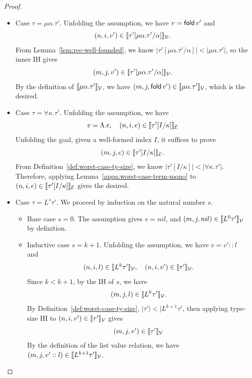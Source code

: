 \begin{proof}
\begin{itemize}
\begin{itemize}
\item {Subcase $m=0$.}
We get $(0,j,v) \in \vrel{\triangleright\tau'}$ directly by the definition.

\item {Subcase $m=k+1$.}
Since $m \leq n$, we have $p$ such that
$n = p+1$ and $k \leq p$. Unfolding $(p+1, i, v) \in \vrel{\triangleright \tau'}$ gives
\[v = \delay v',\quad \quad (p,i+1,v')\in\vrel{\tau'}.\]
Since $k \leq p$ and $j+1\geq i+1$, applying the outer IH gives
\[(k,j+1,v')\in\vrel{\tau'}.\]
Therefore, we have $(k+1,j,\delay v') \in \vrel{\triangleright\tau'}$ by the definition of $\vrel{\triangleright \tau'}$.
\end{itemize}

\item Case $\tau = \mu\alpha.\tau'$.
Unfolding the assumption, we have $v=\mathsf{fold}\, v'$ and 
\[
  (n,i,v')\in
  \llbracket \tau'[\mu\alpha.\tau'/\alpha] \rrbracket_{\mathcal{V}}.
\]
From Lemma~\ref{lem:rec-well-founded}, we know $|\tau'[\mu\alpha.\tau'/\alpha]| < |\mu\alpha.\tau'|$, so the inner IH gives
\[
  (m,j,v')\in
  \llbracket \tau'[\mu\alpha.\tau'/\alpha] \rrbracket_{\mathcal{V}}.
\]
By the definition of $\llbracket \mu\alpha.\tau' \rrbracket_{\mathcal{V}}$, we have 
$(m,j,\mathsf{fold}\, v')\in\llbracket \mu\alpha.\tau' \rrbracket_{\mathcal{V}}$, which is the desired.

\item Case $\tau = \forall\kappa.\tau'$.
Unfolding the assumption, we have 
\[v = \Lambda.e, \quad (n,i,e)\in\llbracket \tau'[I/\kappa] \rrbracket_{\mathcal{E}}\]
Unfolding the goal, given a well-formed index $I$, it suffices to prove
\[(m,j,e) \in \llbracket \tau'[I/\kappa] \rrbracket_{\mathcal{E}}.\]
From Definition~\ref{def:worst-case-ty-size}, we know $|\tau'[I/\kappa]| < |\forall\kappa.\tau'|$. 
Therefore, applying Lemma~\ref{appa:worst-case-term-mono} to $(n,i,e)\in\llbracket \tau'[I/\kappa] \rrbracket_{\mathcal{E}}$
gives the desired.

\item Case $\tau = L^s \tau'$.
We proceed by induction on the natural number $s$.

\begin{itemize}
\item {Base case $s=0$.}
The assumption gives $v=nil$, and $(m,j,nil)\in\llbracket L^0\tau' \rrbracket_{\mathcal{V}}$ by definition.

\item {Inductive case $s=k+1$.}
Unfolding the assumption, we have $v=v'::l$ and
\[
  (n,i,l)\in\llbracket L^k\tau' \rrbracket_{\mathcal{V}}, \quad
  (n,i,v')\in\llbracket \tau' \rrbracket_{\mathcal{V}}.
\]
Since $k < k+1$, by the IH of $s$, we have
\[
  (m,j,l)\in\llbracket L^k\tau' \rrbracket_{\mathcal{V}}.
\]
By Definition~\ref{def:worst-case-ty-size}, $|\tau'|<|L^{k+1}\tau'$, then applying type-size IH to $(n,i,v')\in\llbracket \tau' \rrbracket_{\mathcal{V}}$ gives
\[ (m,j,v')\in\llbracket \tau' \rrbracket_{\mathcal{V}} \]
By the definition of the list value relation, we have $(m,j,v'::l)\in\llbracket L^{k+1}\tau' \rrbracket_{\mathcal{V}}$.
\end{itemize}


\end{itemize}
\end{proof}
